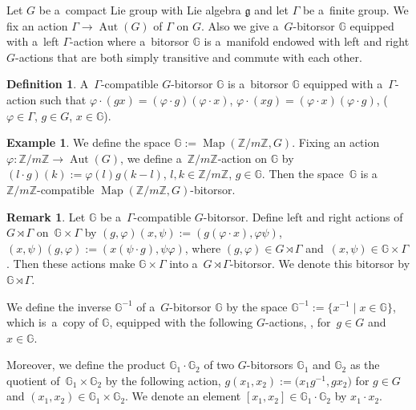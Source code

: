 \documentclass[pdftex]{sigma}
\numberwithin{equation}{section}
\theoremstyle{definition}
\newtheorem{Definition}[Theorem]{Definition}
\newtheorem{Example}[Theorem]{Example}
\newtheorem{Remark}[Theorem]{Remark}
\newcommand{\Map}{\operatorname{Map}}
\newcommand{\Aut}{\operatorname{Aut}}
\newcommand{\bG}{\mathbb{G}}
\newcommand{\bZ}{\mathbb{Z}}
\begin{document}
Let $G$ be a~compact Lie group with Lie algebra $\mathfrak{g}$ and let $\Gamma$ be a~finite group. We fix an action $\Gamma \to \Aut(G)$ of $\Gamma$ on $G$.
Also we give a~$G$-bitorsor $\bG$ equipped with a~left $\Gamma$-action where a~bitorsor $\bG$ is a~manifold endowed with left and right $G$-actions that are both simply transitive and commute with each other.

\begin{Definition} A~$\Gamma$-compatible $G$-bitorsor $\bG$ is a~bitorsor $\bG$ equipped with a~$\Gamma$-action such that $
 \varphi \cdot (g x) = (\varphi \cdot g)(\varphi \cdot x)$, $
 \varphi \cdot (x g) = (\varphi \cdot x)(\varphi \cdot g)$, ($
 \varphi \in \Gamma$, $ g \in G$, $ x \in \bG$).
\end{Definition}

\begin{Example}\label{exam_bitorsor}
 We define the space $\bG := \Map(\bZ/ m \bZ, G)$.
 Fixing an action $\varphi \colon \bZ/m\bZ \to \Aut(G)$, we define a~$\bZ / m \bZ $-action on $\bG$ by
$(l \cdot g)(k) := \varphi(l) g (k - l)$, $ l, k \in \bZ/ m \bZ$, $ g \in \bG$.
 Then the space~$\bG$ is a~$\bZ/ m \bZ$-compatible $\Map(\bZ/ m \bZ, G)$-bitorsor.
\end{Example}

\begin{Remark}\label{compati_bitorsor_and_semi_product}
 Let $\bG$ be a~$\Gamma$-compatible $G$-bitorsor.
 Define left and right actions of~$G \rtimes \Gamma$ on~$\bG \times \Gamma$ by $(g,\varphi)(x,\psi) := (g(\varphi \cdot x), \varphi \psi)$, $(x, \psi)(g,\varphi) := (x(\psi \cdot g), \psi \varphi)$,
 where $(g,\varphi)\in G \rtimes \Gamma$ and~${(x, \psi) \in \bG \times \Gamma}$.
 Then these actions make $\bG \times \Gamma$ into a~$G \rtimes \Gamma$-bitorsor.
 We denote this bitorsor by $\bG \rtimes \Gamma$.
\end{Remark}

We define the inverse $\bG^{-1}$ of a~$G$-bitorsor $\bG$ by the space $\bG^{-1} := \bigl\{x^{-1}\mid x \in \bG\big\}$, which is~a~copy of $\bG$, equipped with the following $G$-actions,
, 
for~${g \in G}$ and $x \in \bG$.

Moreover, we define the product $\bG_1\cdot \bG_2$ of two $G$-bitorsors $\bG_1$ and $\bG_2$ as the quotient of~$\bG_1 \times \bG_2$ by the following action,
$g (x_1,x_2) := \bigl(x_1 g^{-1}, g x_2\bigr)$
for $g \in G$ and $(x_1,x_2) \in \bG_1 \times \bG_2$.
We denote an element $[x_1,x_2] \in \bG_1 \cdot \bG_2$ by $x_1 \cdot x_2$.
\end{document}
